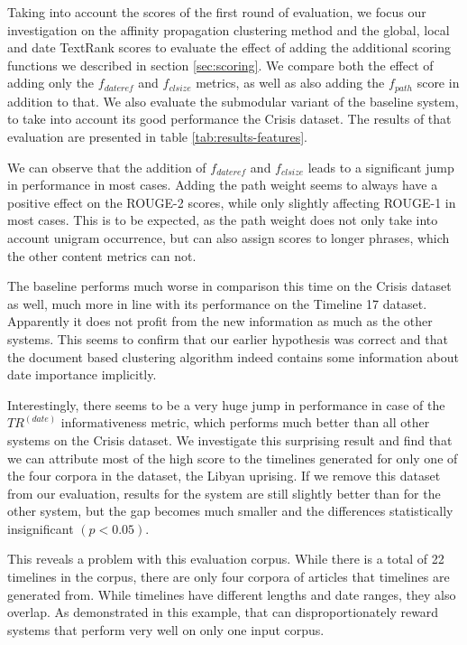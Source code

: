 \documentclass[a4paper,BCOR=10mm]{report}
\numberwithin{lemma}{chapter}
\numberwithin{definition}{chapter}
\begin{document}
Taking into account the scores of the first round of evaluation, we focus our investigation on the affinity propagation clustering method and the global, local and date TextRank scores to evaluate the effect of adding the additional scoring functions we described in section \ref{sec:scoring}.
We compare both the effect of adding only the $f_{dateref}$ and $f_{clsize}$ metrics, as well as also adding the $f_{path}$ score in addition to that. We also evaluate the submodular variant of the baseline system, to take into account its good performance the Crisis dataset.
The results of that evaluation are presented in table \ref{tab:results-features}.

We can observe that the addition of $f_{dateref}$ and $f_{clsize}$ leads to a significant jump in performance in most cases.
Adding the path weight seems to always have a positive effect on the ROUGE-2 scores, while only slightly affecting ROUGE-1 in most cases.
This is to be expected, as the path weight does not only take into account unigram occurrence, but can also assign scores to longer phrases, which the other content metrics can not.

The baseline performs much worse in comparison this time on the Crisis dataset as well, much more in line with its performance on the Timeline 17 dataset. Apparently it does not profit from the new information as much as the other systems. This seems to confirm that our earlier hypothesis was correct and that the document based clustering algorithm indeed contains some information about date importance implicitly.

Interestingly, there seems to be a very huge jump in performance in case of the $TR^{(date)}$ informativeness metric, which performs much better than all other systems on the Crisis dataset. We investigate this surprising result and find that we can attribute most of the high score to the timelines generated for only one of the four corpora in the dataset, the Libyan uprising.
If we remove this dataset from our evaluation, results for the system are still slightly better than for the other system, but the gap becomes much smaller and the differences statistically insignificant $(p < 0.05)$.

This reveals a problem with this evaluation corpus. While there is a total of 22 timelines in the corpus, there are only four corpora of articles that timelines are generated from. While timelines have different lengths and date ranges, they also overlap. As demonstrated in this example, that can disproportionately reward systems that perform very well on only one input corpus.
\end{document}

